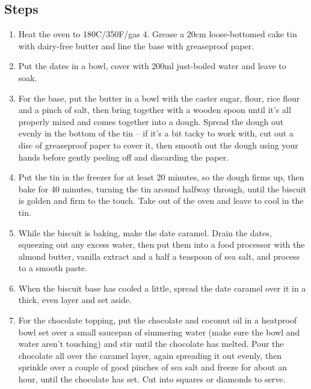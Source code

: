 \documentclass{book}
\begin{document}
\subsection*{Steps}
\begin{enumerate}
\item Heat the oven to 180C/350F/gas 4. Grease a 20cm loose-bottomed cake tin with dairy-free butter and line the base with greaseproof paper.
\item Put the dates in a bowl, cover with 200ml just-boiled water and leave to soak.
\item For the base, put the butter in a bowl with the caster sugar, flour, rice flour and a pinch of salt, then bring together with a wooden spoon until it’s all properly mixed and comes together into a dough. Spread the dough out evenly in the bottom of the tin – if it’s a bit tacky to work with, cut out a disc of greaseproof paper to cover it, then smooth out the dough using your hands before gently peeling off and discarding the paper.
\item Put the tin in the freezer for at least 20 minutes, so the dough firms up, then bake for 40 minutes, turning the tin around halfway through, until the biscuit is golden and firm to the touch. Take out of the oven and leave to cool in the tin.
\item While the biscuit is baking, make the date caramel. Drain the dates, squeezing out any excess water, then put them into a food processor with the almond butter, vanilla extract and a half a teaspoon of sea salt, and process to a smooth paste.
\item When the biscuit base has cooled a little, spread the date caramel over it in a thick, even layer and set aside.
\item For the chocolate topping, put the chocolate and coconut oil in a heatproof bowl set over a small saucepan of simmering water (make sure the bowl and water aren’t touching) and stir until the chocolate has melted. Pour the chocolate all over the caramel layer, again spreading it out evenly, then sprinkle over a couple of good pinches of sea salt and freeze for about an hour, until the chocolate has set. Cut into squares or diamonds to serve.
\end{enumerate}
\newpage
\end{document}

